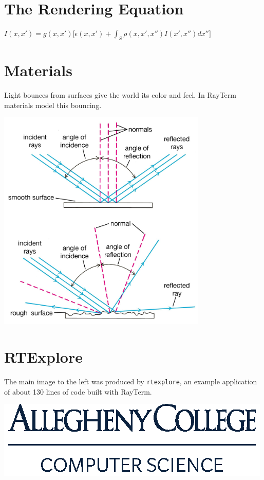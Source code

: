 \documentclass[alleghenyposter]{betterposter}
\begin{document}
{\section{The Rendering Equation}
\vspace{-1.5em}
\begin{center}
$I(x, x') = g(x, x') \Big[\epsilon(x, x') + \int_{S} \rho(x, x',x'')I(x', x'')dx''\Big]$
\end{center}

\section{Materials}
Light bounces from surfaces give the world its color and feel.
In RayTerm materials model this bouncing.

\begin{center}
\includegraphics[width=0.75\textwidth]{img/surface}
\end{center}

\section{RTExplore}
The main image to the left was produced by \texttt{rtexplore}, an example application of about 130 lines of code built with RayTerm.
\vfill

\includegraphics[width=\textwidth]{img/cmpsc-logo}\\

}
\end{document}
